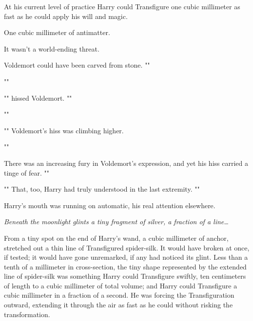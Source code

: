 At his current level of practice Harry could Transfigure one cubic millimeter
as fast as he could apply his will and magic.

One cubic millimeter of antimatter.

It wasn't a world-ending threat.

Voldemort could have been carved from stone. ""

""

"" hissed Voldemort. ""

""

"" Voldemort's hiss was climbing
higher.

""

There was an increasing fury in Voldemort's expression, and yet his hiss
carried a tinge of fear. ""

"" That, too, Harry had truly understood in the last extremity.
""

Harry's mouth was running on automatic, his real attention elsewhere.

\emph{Beneath the moonlight glints a tiny fragment of silver, a fraction of a
line{\ldots}}

From a tiny spot on the end of Harry's wand, a cubic millimeter of anchor,
stretched out a thin line of Transfigured spider-silk. It would have broken at
once, if tested; it would have gone unremarked, if any had noticed its glint.
Less than a tenth of a millimeter in cross-section, the tiny shape represented
by the extended line of spider-silk was something Harry could Transfigure
swiftly, ten centimeters of length to a cubic millimeter of total volume; and
Harry could Transfigure a cubic millimeter in a fraction of a second. He was
forcing the Transfiguration outward, extending it through the air as fast as he
could without risking the transformation.

